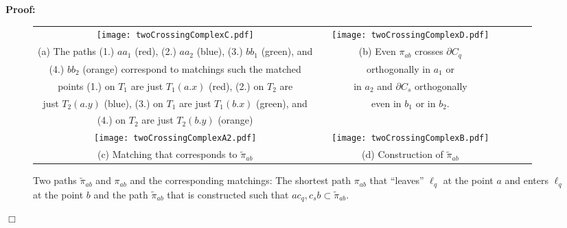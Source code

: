 \documentclass[a4paper,11pt]{article}
\newenvironment{proof}{\textbf{Proof:}}{\hspace*{0mm}\hfill\ensuremath{\Box}}
\begin{document}
\begin{proof}
\begin{figure}[ht]
  \begin{center}
    \begin{tabular}{ccccccc}
      \texttt{[image: twoCrossingComplexC.pdf]} & &
       \texttt{[image: twoCrossingComplexD.pdf]}&&\\ 
{\small (a) The paths (1.) $aa_1$ (red), (2.) $aa_2$ (blue), (3.) $bb_1$ (green), and } & &
      {\small (b) Even $\pi_{ab}$ crosses $\partial C_q$}&&\\
      {\small (4.) $bb_2$ (orange) correspond to matchings such the matched}& &
      {\small orthogonally in $a_1$ or}&&\\
      {\small points (1.) on $T_1$ are just $T_1(a.x)$ (red), (2.) on $T_2$ are}&&
      {\small in $a_2$ and $\partial C_s$ orthogonally }&&\\
      {\small just $T_2(a.y)$ (blue), (3.) on $T_1$ are just $T_1(b.x)$ (green), and }&&
      {\small even in $b_1$ or in $b_2$.}\\
      {\small (4.) on $T_2$ are just $T_2(b.y)$ (orange)}&&
      {\small }\\
      \texttt{[image: twoCrossingComplexA2.pdf]} & &
       \texttt{[image: twoCrossingComplexB.pdf]}&&\\ 
{\small (c) Matching that corresponds to $\widetilde{\pi}_{ab}$} & &
      {\small (d) Construction of $\widetilde{\pi}_{ab}$}&&\\
    \end{tabular}
  \end{center}
  \vspace*{-12pt}
  \caption{Two paths $\widetilde{\pi}_{ab}$ and $\pi_{ab}$ and the corresponding matchings: The shortest path $\pi_{ab}$ that ``leaves'' $\ell_{q}$ at the point $a$ and enters $\ell_{q}$ at the point $b$ and the path $\widetilde{\pi}_{ab}$ that is constructed such that $ac_q,c_sb \subset \widetilde{\pi}_{ab}$.}
  \label{fig:twoCrossingComplex}
\end{figure}


\end{proof}
\end{document}
